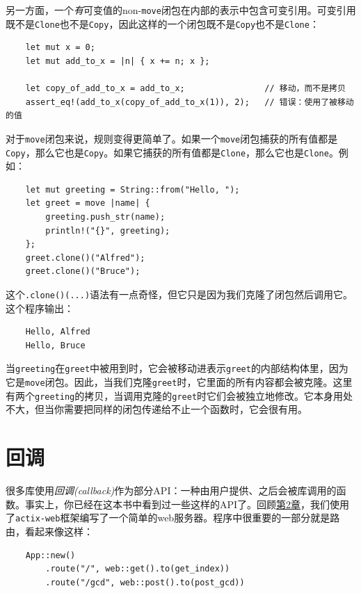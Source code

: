 另一方面，一个\emph{有}可变值的non-\texttt{move}闭包在内部的表示中包含可变引用。可变引用既不是\texttt{Clone}也不是\texttt{Copy}，因此这样的一个闭包既不是\texttt{Copy}也不是\texttt{Clone}：
\begin{verbatim}
    let mut x = 0;
    let mut add_to_x = |n| { x += n; x };

    let copy_of_add_to_x = add_to_x;                // 移动，而不是拷贝
    assert_eq!(add_to_x(copy_of_add_to_x(1)), 2);   // 错误：使用了被移动的值
\end{verbatim}

对于\texttt{move}闭包来说，规则变得更简单了。如果一个\texttt{move}闭包捕获的所有值都是\texttt{Copy}，那么它也是\texttt{Copy}。如果它捕获的所有值都是\texttt{Clone}，那么它也是\texttt{Clone}。例如：
\begin{verbatim}
    let mut greeting = String::from("Hello, ");
    let greet = move |name| {
        greeting.push_str(name);
        println!("{}", greeting);
    };
    greet.clone()("Alfred");
    greet.clone()("Bruce");
\end{verbatim}

这个\texttt{.clone()(...)}语法有一点奇怪，但它只是因为我们克隆了闭包然后调用它。这个程序输出：
\begin{verbatim}
    Hello, Alfred
    Hello, Bruce
\end{verbatim}

当\texttt{greeting}在\texttt{greet}中被用到时，它会被移动进表示\texttt{greet}的内部结构体里，因为它是\texttt{move}闭包。因此，当我们克隆\texttt{greet}时，它里面的所有内容都会被克隆。这里有两个\texttt{greeting}的拷贝，当调用克隆的\texttt{greet}时它们会被独立地修改。它本身用处不大，但当你需要把同样的闭包传递给不止一个函数时，它会很有用。

\section{回调}\label{callback}

很多库使用\emph{回调(callback)}作为部分API：一种由用户提供、之后会被库调用的函数。事实上，你已经在这本书中看到过一些这样的API了。回顾\hyperref[ch02]{第2章}，我们使用了\texttt{actix-web}框架编写了一个简单的web服务器。程序中很重要的一部分就是路由，看起来像这样：
\begin{verbatim}
    App::new()
        .route("/", web::get().to(get_index))
        .route("/gcd", web::post().to(post_gcd))
\end{verbatim}


